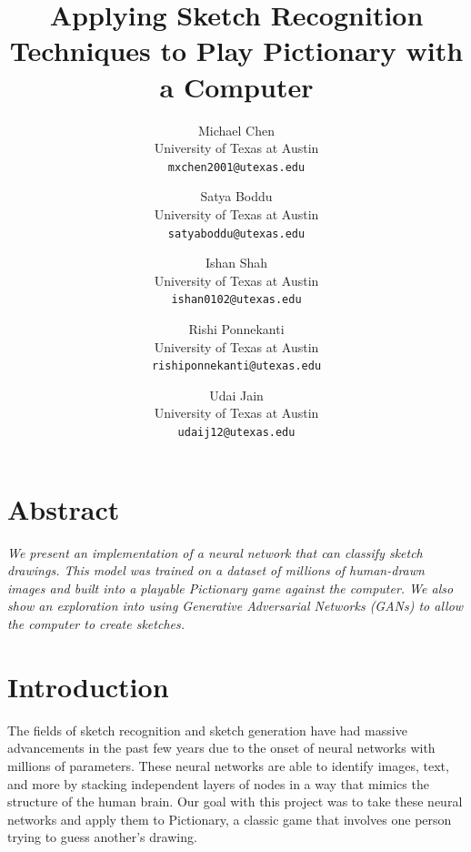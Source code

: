 \documentclass[10pt,twocolumn,letterpaper]{article}
\begin{document}
\title{Applying Sketch Recognition Techniques to Play Pictionary with a Computer}

\author{Michael Chen\\
University of Texas at Austin\\
{\tt\small mxchen2001@utexas.edu}
\and
Satya Boddu\\
University of Texas at Austin\\
{\tt\small satyaboddu@utexas.edu}
\and
Ishan Shah\\
University of Texas at Austin\\
{\tt\small ishan0102@utexas.edu}
\and
Rishi Ponnekanti\\
University of Texas at Austin\\
{\tt\small rishiponnekanti@utexas.edu}
\and
Udai Jain\\
University of Texas at Austin\\
{\tt\small udaij12@utexas.edu}
}

\maketitle

{\centering \section*{Abstract}}

\emph{We present an implementation of a neural network that can classify sketch drawings. This model was trained on a dataset of millions of human-drawn images and built into a playable Pictionary game against the computer. We also show an exploration into using Generative Adversarial Networks (GANs) to allow the computer to create sketches.} \vspace{1em}

\section{Introduction}

The fields of sketch recognition and sketch generation have had massive advancements in the past few years due to the onset of neural networks with millions of parameters. These neural networks are able to identify images, text, and more by stacking independent layers of nodes in a way that mimics the structure of the human brain. Our goal with this project was to take these neural networks and apply them to Pictionary, a classic game that involves one person trying to guess another’s drawing.
\end{document}
